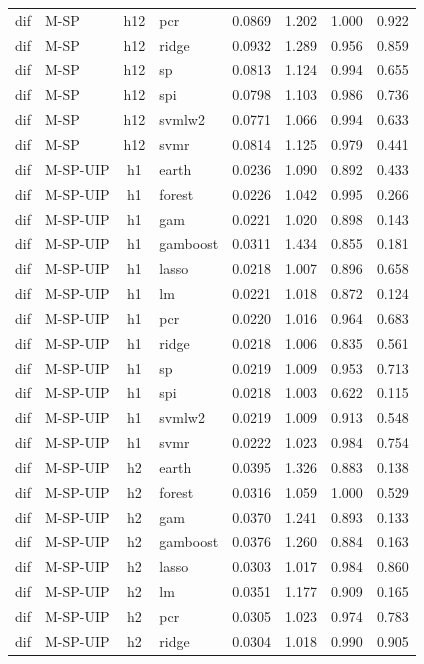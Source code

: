 \begin{ThreePartTable}
\begin{longtable}[t]{llclcccc}
dif & M-SP & h12 & pcr & 0.0869 & 1.202 & 1.000 & 0.922\\
dif & M-SP & h12 & ridge & 0.0932 & 1.289 & 0.956 & 0.859\\
dif & M-SP & h12 & sp & 0.0813 & 1.124 & 0.994 & 0.655\\
dif & M-SP & h12 & spi & 0.0798 & 1.103 & 0.986 & 0.736\\
dif & M-SP & h12 & svmlw2 & 0.0771 & 1.066 & 0.994 & 0.633\\
dif & M-SP & h12 & svmr & 0.0814 & 1.125 & 0.979 & 0.441\\
\addlinespace
dif & M-SP-UIP & h1 & earth & 0.0236 & 1.090 & 0.892 & 0.433\\
dif & M-SP-UIP & h1 & forest & 0.0226 & 1.042 & 0.995 & 0.266\\
dif & M-SP-UIP & h1 & gam & 0.0221 & 1.020 & 0.898 & 0.143\\
dif & M-SP-UIP & h1 & gamboost & 0.0311 & 1.434 & 0.855 & 0.181\\
dif & M-SP-UIP & h1 & lasso & 0.0218 & 1.007 & 0.896 & 0.658\\
dif & M-SP-UIP & h1 & lm & 0.0221 & 1.018 & 0.872 & 0.124\\
dif & M-SP-UIP & h1 & pcr & 0.0220 & 1.016 & 0.964 & 0.683\\
dif & M-SP-UIP & h1 & ridge & 0.0218 & 1.006 & 0.835 & 0.561\\
dif & M-SP-UIP & h1 & sp & 0.0219 & 1.009 & 0.953 & 0.713\\
dif & M-SP-UIP & h1 & spi & 0.0218 & 1.003 & 0.622 & 0.115\\
dif & M-SP-UIP & h1 & svmlw2 & 0.0219 & 1.009 & 0.913 & 0.548\\
dif & M-SP-UIP & h1 & svmr & 0.0222 & 1.023 & 0.984 & 0.754\\
\addlinespace
dif & M-SP-UIP & h2 & earth & 0.0395 & 1.326 & 0.883 & 0.138\\
dif & M-SP-UIP & h2 & forest & 0.0316 & 1.059 & 1.000 & 0.529\\
dif & M-SP-UIP & h2 & gam & 0.0370 & 1.241 & 0.893 & 0.133\\
dif & M-SP-UIP & h2 & gamboost & 0.0376 & 1.260 & 0.884 & 0.163\\
dif & M-SP-UIP & h2 & lasso & 0.0303 & 1.017 & 0.984 & 0.860\\
dif & M-SP-UIP & h2 & lm & 0.0351 & 1.177 & 0.909 & 0.165\\
dif & M-SP-UIP & h2 & pcr & 0.0305 & 1.023 & 0.974 & 0.783\\
dif & M-SP-UIP & h2 & ridge & 0.0304 & 1.018 & 0.990 & 0.905\\

\end{longtable}
\end{ThreePartTable}
